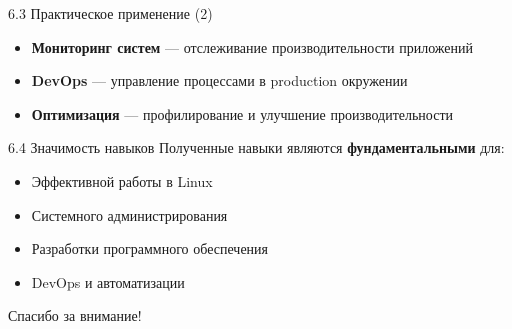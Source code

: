 \documentclass[
  ignorenonframetext,
  aspectratio=169,
  russian,
]{beamer}
\providecommand{\tightlist}{%
  \setlength{\itemsep}{0pt}\setlength{\parskip}{0pt}}
\begin{document}
\begin{frame}{6.3 Практическое применение (2)}
\label{ux43fux440ux430ux43aux442ux438ux447ux435ux441ux43aux43eux435-ux43fux440ux438ux43cux435ux43dux435ux43dux438ux435-2}
\begin{itemize}[<+->]
\tightlist
\item
  \textbf{Мониторинг систем} --- отслеживание производительности
  приложений
\item
  \textbf{DevOps} --- управление процессами в production окружении
\item
  \textbf{Оптимизация} --- профилирование и улучшение производительности
\end{itemize}
\end{frame}

\begin{frame}{6.4 Значимость навыков}
\label{ux437ux43dux430ux447ux438ux43cux43eux441ux442ux44c-ux43dux430ux432ux44bux43aux43eux432}
Полученные навыки являются \textbf{фундаментальными} для:

\begin{itemize}[<+->]
\tightlist
\item
  Эффективной работы в Linux
\item
  Системного администрирования
\item
  Разработки программного обеспечения
\item
  DevOps и автоматизации
\end{itemize}
\end{frame}

\begin{frame}[standout]{6.5 }
\label{section}
Спасибо за внимание!
\end{frame}
\end{document}
